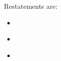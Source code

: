 \documentclass[english]{article}
\begin{document}
Restatements are:

\begin{itemize}
\item \cite{restatetrusts}
\item \cite{restatelawlawyer}
\item \cite{restateproperty}
\end{itemize}

\printbibliography[title={Table of Restatements}]
\end{document}
